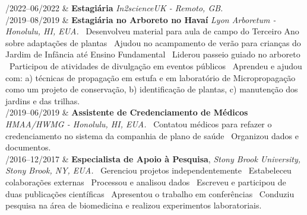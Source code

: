 \documentclass[11pt, a4paper]{article}
\newcommand{\Duration}[2]{\fontsize{10pt}{0}\selectfont #1--#2}
\begin{document}
\begin{EntriesTable}

	\Duration{01/2022}{06/2022}  &
	\textbf{Estagiária}
	\newline
	\textit{In2scienceUK - Remoto, GB.}
	\\


	\Duration{06/2019}{08/2019}  &
	\textbf{Estagiária no Arboreto no Havaí}
	\newline
	\textit{Lyon Arboretum - Honolulu, HI, EUA.}
	\newline
	\textbullet \ Desenvolveu material para aula de campo do Terceiro 
	Ano sobre adaptações de plantas 
	\textbullet \ Ajudou no acampamento de verão para 
	crianças do Jardim de Infância até Ensino Fundamental 
	\textbullet \ Liderou passeio guiado no arboreto 
	\textbullet \ Participou de atividades de divulgação em 
	eventos públicos 
	\textbullet \ Aprendeu e ajudou com: a) técnicas de propagação em estufa
	e em laboratório de Micropropagação como um projeto de conservação, b)
	identificação de plantas, c) manutenção dos jardins e das trilhas.
	\\

	\Duration{03/2019}{06/2019}  &
	\textbf{Assistente de Credenciamento de Médicos}
	\newline
	\textit{HMAA/HWMG - Honolulu, HI, EUA.}
	\newline
	\textbullet \ Contatou médicos para refazer o credenciamento no sistema 
	da companhia de plano de saúde 
	\textbullet \ Organizou dados e documentos.
	\\

	\Duration{08/2016}{12/2017}  &
	\textbf{Especialista de Apoio à Pesquisa},
	\newline
	\textit{Stony Brook University, Stony Brook, NY, EUA.}
	\newline
	\textbullet \ Gerenciou projetos independentemente 
	\textbullet \ Estabeleceu colaborações externas 
	\textbullet \ Processou e analisou dados 
	\textbullet \ Escreveu e participou de duas publicações científicas 
	\textbullet \ Apresentou o trabalho em conferências 
	\textbullet\ Conduziu pesquisa na área de biomedicina e realizou 
	experimentos laboratoriais.
	\\

\end{EntriesTable}
\end{document}
